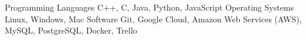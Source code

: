 
\begin{cvskills}
  \cvskill
    {\normalsize Programming Languages} %
    {\normalsize C++, C, Java, Python, JavaScript} %
  \cvskill
    {Operating Systems} %
    {\normalsize Linux, Windows, Mac}
  \cvskill
    {Software} %
    {\normalsize Git, Google Cloud, Amazon Web Services (AWS), MySQL, PostgreSQL, Docker, Trello}
\end{cvskills}
